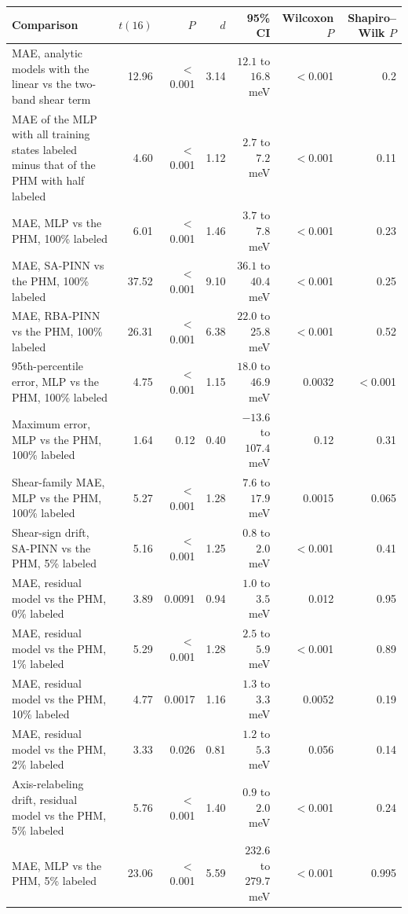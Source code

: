 \begin{tabular}{>{\raggedright\arraybackslash}p{6.2cm}rrrrrr}
\toprule
\textbf{Comparison} & \textbf{$t(16)$} & \textbf{$P$} & \textbf{$d$} & \textbf{95\% CI} & \textbf{Wilcoxon $P$} & \textbf{Shapiro--Wilk $P$} \\
\midrule
MAE, analytic models with the linear vs the two-band shear term & 12.96 & $<$0.001 & 3.14 & $12.1$ to $16.8$~meV & $<$0.001 & 0.2 \\
MAE of the MLP with all training states labeled minus that of the PHM with half labeled & 4.60 & $<$0.001 & 1.12 & $2.7$ to $7.2$~meV & $<$0.001 & 0.11 \\
MAE, MLP vs the PHM, 100\% labeled & 6.01 & $<$0.001 & 1.46 & $3.7$ to $7.8$~meV & $<$0.001 & 0.23 \\
MAE, SA-PINN vs the PHM, 100\% labeled & 37.52 & $<$0.001 & 9.10 & $36.1$ to $40.4$~meV & $<$0.001 & 0.25 \\
MAE, RBA-PINN vs the PHM, 100\% labeled & 26.31 & $<$0.001 & 6.38 & $22.0$ to $25.8$~meV & $<$0.001 & 0.52 \\
95th-percentile error, MLP vs the PHM, 100\% labeled & 4.75 & $<$0.001 & 1.15 & $18.0$ to $46.9$~meV & 0.0032 & $<$0.001 \\
Maximum error, MLP vs the PHM, 100\% labeled & 1.64 & 0.12 & 0.40 & $-13.6$ to $107.4$~meV & 0.12 & 0.31 \\
Shear-family MAE, MLP vs the PHM, 100\% labeled & 5.27 & $<$0.001 & 1.28 & $7.6$ to $17.9$~meV & 0.0015 & 0.065 \\
Shear-sign drift, SA-PINN vs the PHM, 5\% labeled & 5.16 & $<$0.001 & 1.25 & $0.8$ to $2.0$~meV & $<$0.001 & 0.41 \\
MAE, residual model vs the PHM, 0\% labeled & 3.89 & 0.0091 & 0.94 & $1.0$ to $3.5$~meV & 0.012 & 0.95 \\
MAE, residual model vs the PHM, 1\% labeled & 5.29 & $<$0.001 & 1.28 & $2.5$ to $5.9$~meV & $<$0.001 & 0.89 \\
MAE, residual model vs the PHM, 10\% labeled & 4.77 & 0.0017 & 1.16 & $1.3$ to $3.3$~meV & 0.0052 & 0.19 \\
MAE, residual model vs the PHM, 2\% labeled & 3.33 & 0.026 & 0.81 & $1.2$ to $5.3$~meV & 0.056 & 0.14 \\
Axis-relabeling drift, residual model vs the PHM, 5\% labeled & 5.76 & $<$0.001 & 1.40 & $0.9$ to $2.0$~meV & $<$0.001 & 0.24 \\
MAE, MLP vs the PHM, 5\% labeled & 23.06 & $<$0.001 & 5.59 & $232.6$ to $279.7$~meV & $<$0.001 & 0.995 \\

\end{tabular}
